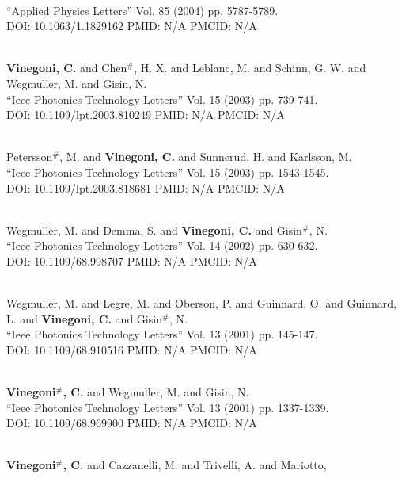 \\ ``Applied Physics Letters'' Vol. 85 (2004) pp. 5787-5789. \\ DOI: 10.1063/1.1829162 PMID: N/A PMCID: N/A\item {} \\ {\bf Vinegoni, C.} and Chen$^\#$, H. X. and Leblanc, M. and Schinn, G. W. and Wegmuller, M. and Gisin, N. \\ ``Ieee Photonics Technology Letters'' Vol. 15 (2003) pp. 739-741. \\ DOI: 10.1109/lpt.2003.810249 PMID: N/A PMCID: N/A\item {} \\ Petersson$^\#$, M. and {\bf Vinegoni, C.} and Sunnerud, H. and Karlsson, M. \\ ``Ieee Photonics Technology Letters'' Vol. 15 (2003) pp. 1543-1545. \\ DOI: 10.1109/lpt.2003.818681 PMID: N/A PMCID: N/A\item {} \\ Wegmuller, M. and Demma, S. and {\bf Vinegoni, C.} and Gisin$^\#$, N. \\ ``Ieee Photonics Technology Letters'' Vol. 14 (2002) pp. 630-632. \\ DOI: 10.1109/68.998707 PMID: N/A PMCID: N/A\item {} \\ Wegmuller, M. and Legre, M. and Oberson, P. and Guinnard, O. and Guinnard, L. and {\bf Vinegoni, C.} and Gisin$^\#$, N. \\ ``Ieee Photonics Technology Letters'' Vol. 13 (2001) pp. 145-147. \\ DOI: 10.1109/68.910516 PMID: N/A PMCID: N/A\item {} \\ {\bf Vinegoni$^\#$, C.} and Wegmuller, M. and Gisin, N. \\ ``Ieee Photonics Technology Letters'' Vol. 13 (2001) pp. 1337-1339. \\ DOI: 10.1109/68.969900 PMID: N/A PMCID: N/A\item {} \\ {\bf Vinegoni$^\#$, C.} and Cazzanelli, M. and Trivelli, A. and Mariotto, 